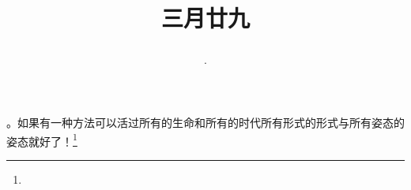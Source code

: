 \title{\date[d=7,m=5,y=2024][year:cn-y,年,month:cn,day:cn,日,·,weekday]·三月廿九 }
。如果有一种方法可以活过所有的生命和所有的时代所有形式的形式与所有姿态的姿态就好了！\footnote{ }

